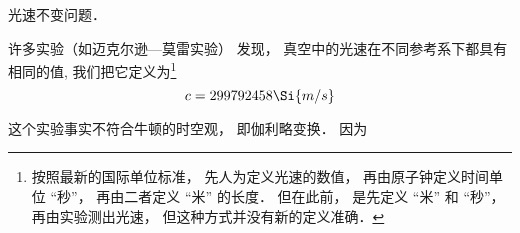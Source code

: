 
光速不变问题．

许多实验（如迈克尔逊—莫雷实验）%
发现， 真空中的光速在不同参考系下都具有相同的值, 我们把它定义为\footnote{按照最新的国际单位标准， 先人为定义光速的数值， 再由原子钟定义时间单位 “秒”， 再由二者定义 “米” 的长度． 但在此前， 是先定义 “米” 和 “秒”， 再由实验测出光速， 但这种方式并没有新的定义准确．}
\begin{equation}
c = 299792458\Si{m/s}
\end{equation}

这个实验事实不符合牛顿的时空观， 即伽利略变换． 因为

